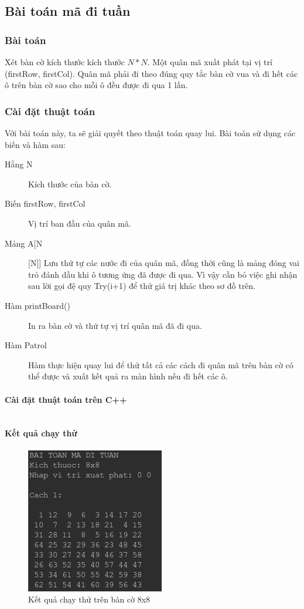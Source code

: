 \documentclass[8pt, a4paper]{article}
\newcommand{\mnt}[1]{\inputminted[frame=single, linenos=true, tabsize=4]{c++}{#1}}
\begin{document}
\subsection{Bài toán mã đi tuần}

\subsubsection{Bài toán}

Xét bàn cờ kích thước kích thước $N*N$. Một quân mã xuất phát tại vị trí (firstRow, firstCol). Quân mã phải đi theo đúng quy tắc bàn cờ vua và đi hết các ô trên bàn cờ sao cho mỗi ô đều được đi qua 1 lần.

\subsubsection{Cài đặt thuật toán}

Với bài toán này, ta sẽ giải quyết theo thuật toán quay lui. Bài toán sử dụng các biến và hàm sau:

\begin{description}
\item [Hằng N] Kích thước của bàn cờ.
\item [Biến firstRow, firstCol] Vị trí ban đầu của quân mã.
\item [Mảng A[N][N]] Lưu thứ tự các nước đi của quân mã, đồng thời cũng là mảng đóng vai trỏ đánh dầu khi ô tương ứng đã được đi qua. Vì vậy cần bỏ việc ghi nhận sau lời gọi đệ quy Try(i+1) để thử giá trị khác theo sơ đồ trên.
\item [Hàm printBoard()] In ra bàn cờ và thứ tự vị trí quân mã đã đi qua.
\item [Hàm Patrol] Hàm thực hiện quay lui để thử tất cả các cách đi quân mã trên bàn cờ có thể được và xuất kết quả ra màn hình nếu đi hết các ô.
\end{description}

\paragraph{Cài đặt thuật toán trên C++}
\mnt{src/knight.cpp}
\paragraph{Kết quả chạy thử}
\begin{figure}[htp]
\centering
\includegraphics[scale=0.50]{img/knight1.png}
\caption{Kết quả chạy thử trên bàn cờ 8x8}
\label{}
\end{figure}
\end{document}
